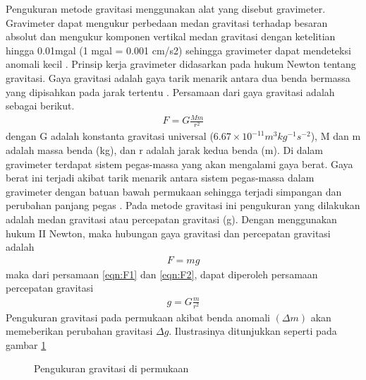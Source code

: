\hspace{25pt} Pengukuran metode gravitasi menggunakan alat yang disebut gravimeter. Gravimeter dapat mengukur perbedaan medan gravitasi terhadap besaran absolut dan mengukur komponen vertikal medan gravitasi dengan ketelitian hingga 0.01mgal (1 mgal = 0.001 cm/s2) sehingga gravimeter dapat mendeteksi anomali kecil \citep{AmizadehDasgupta}. Prinsip kerja gravimeter didasarkan pada hukum Newton tentang gravitasi. Gaya gravitasi adalah gaya tarik menarik antara dua benda bermassa yang dipisahkan pada jarak tertentu \citep{JacobsRussel}. Persamaan dari gaya gravitasi adalah sebagai berikut.
\begin{align}
	F = G \frac{Mm}{r^{2}} \label{eqn:F1}
\end{align}
dengan G adalah konstanta gravitasi universal ($6.67\times 10^{-11}m^{3}kg^{-1}s^{-2}$), M dan m adalah massa benda (kg), dan r adalah jarak kedua benda (m).
\vskip5pt
\hspace{25pt} Di dalam gravimeter terdapat sistem pegas-massa yang akan mengalami gaya berat. Gaya berat ini terjadi akibat tarik menarik antara sistem pegas-massa dalam gravimeter dengan batuan bawah permukaan sehingga terjadi simpangan dan perubahan panjang pegas \citep{Munadi}. Pada metode gravitasi ini pengukuran yang dilakukan adalah medan gravitasi atau percepatan gravitasi (g). Dengan menggunakan hukum II Newton, maka hubungan gaya gravitasi dan percepatan gravitasi adalah
\begin{align}
	F = mg \label{eqn:F2}
\end{align}
maka dari persamaan \eqref{eqn:F1} dan \eqref{eqn:F2}, dapat diperoleh persamaan percepatan gravitasi
\begin{align}
	g = G \frac{m}{r^{2}} \label{eqn:g}
\end{align}
Pengukuran gravitasi pada permukaan akibat benda anomali $(\Delta m)$ akan memeberikan perubahan gravitasi $\Delta g$. Ilustrasinya ditunjukkan seperti pada gambar \ref{fig:PengukuranGravity}
\begin{figure}[h]
\centering
{}
\caption{Pengukuran gravitasi di permukaan}
\label{fig:PengukuranGravity}
\end{figure}

